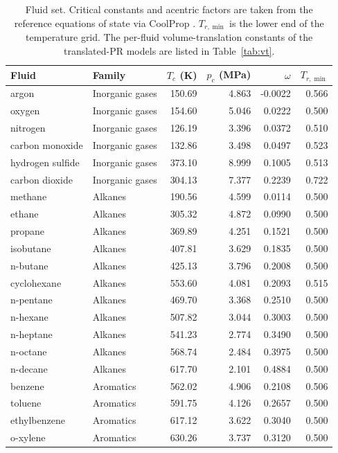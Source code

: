 \begin{table}[H]
\centering
\caption{Fluid set. Critical constants and acentric factors are taken from the reference equations of state via CoolProp \cite{Bell2014}. $T_{r,\min}$ is the lower end of the temperature grid. The per-fluid volume-translation constants of the translated-PR models are listed in Table~\ref{tab:vt}.}
\label{tab:fluids}
\small
\begin{tabular}{llrrrr}
\toprule
Fluid & Family & $T_c$ (K) & $p_c$ (MPa) & $\omega$ & $T_{r,\min}$ \\
\midrule
argon & Inorganic gases & 150.69 & 4.863 & -0.0022 & 0.566 \\
oxygen & Inorganic gases & 154.60 & 5.046 & 0.0222 & 0.500 \\
nitrogen & Inorganic gases & 126.19 & 3.396 & 0.0372 & 0.510 \\
carbon monoxide & Inorganic gases & 132.86 & 3.498 & 0.0497 & 0.523 \\
hydrogen sulfide & Inorganic gases & 373.10 & 8.999 & 0.1005 & 0.513 \\
carbon dioxide & Inorganic gases & 304.13 & 7.377 & 0.2239 & 0.722 \\
methane & Alkanes & 190.56 & 4.599 & 0.0114 & 0.500 \\
ethane & Alkanes & 305.32 & 4.872 & 0.0990 & 0.500 \\
propane & Alkanes & 369.89 & 4.251 & 0.1521 & 0.500 \\
isobutane & Alkanes & 407.81 & 3.629 & 0.1835 & 0.500 \\
n-butane & Alkanes & 425.13 & 3.796 & 0.2008 & 0.500 \\
cyclohexane & Alkanes & 553.60 & 4.081 & 0.2093 & 0.515 \\
n-pentane & Alkanes & 469.70 & 3.368 & 0.2510 & 0.500 \\
n-hexane & Alkanes & 507.82 & 3.044 & 0.3003 & 0.500 \\
n-heptane & Alkanes & 541.23 & 2.774 & 0.3490 & 0.500 \\
n-octane & Alkanes & 568.74 & 2.484 & 0.3975 & 0.500 \\
n-decane & Alkanes & 617.70 & 2.101 & 0.4884 & 0.500 \\
benzene & Aromatics & 562.02 & 4.906 & 0.2108 & 0.506 \\
toluene & Aromatics & 591.75 & 4.126 & 0.2657 & 0.500 \\
ethylbenzene & Aromatics & 617.12 & 3.622 & 0.3040 & 0.500 \\
o-xylene & Aromatics & 630.26 & 3.737 & 0.3120 & 0.500 \\

\end{tabular}
\end{table}
